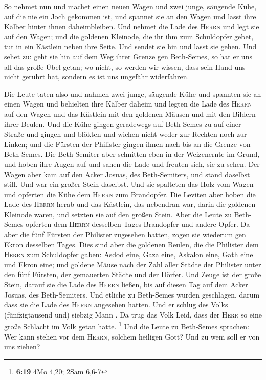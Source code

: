  So nehmet nun und machet einen neuen Wagen und zwei
junge, säugende Kühe, auf die nie ein Joch gekommen ist, und spannet sie
an den Wagen und lasst ihre Kälber hinter ihnen daheimbleiben.
 Und nehmet die Lade des \textsc{Herrn} und legt sie auf
den Wagen; und die goldenen Kleinode, die ihr ihm zum Schuldopfer gebet,
tut in ein Kästlein neben ihre Seite. Und sendet sie hin und lasst sie
gehen.  Und sehet zu: geht sie hin auf dem Weg ihrer
Grenze gen Beth-Semes, so hat er uns all das große Übel getan; wo nicht,
so werden wir wissen, dass sein Hand uns nicht gerührt hat, sondern es
ist uns ungefähr widerfahren.

 Die Leute taten also und nahmen zwei junge, säugende
Kühe und spannten sie an einen Wagen und behielten ihre Kälber daheim
 und legten die Lade des \textsc{Herrn} auf den Wagen und
das Kästlein mit den goldenen Mäusen und mit den Bildern ihrer Beulen.
 Und die Kühe gingen geradewegs auf Beth-Semes zu auf
einer Straße und gingen und blökten und wichen nicht weder zur Rechten
noch zur Linken; und die Fürsten der Philister gingen ihnen nach bis an
die Grenze von Beth-Semes.  Die Beth-Semiter aber
schnitten eben in der Weizenernte im Grund, und hoben ihre Augen auf und
sahen die Lade und freuten sich, sie zu sehen.  Der Wagen
aber kam auf den Acker Josuas, des Beth-Semiters, und stand daselbst
still. Und war ein großer Stein daselbst. Und sie spalteten das Holz vom
Wagen und opferten die Kühe dem \textsc{Herrn} zum Brandopfer.
 Die Leviten aber hoben die Lade des \textsc{Herrn} herab
und das Kästlein, das nebendran war, darin die goldenen Kleinode waren,
und setzten sie auf den großen Stein. Aber die Leute zu Beth-Semes
opferten dem \textsc{Herrn} desselben Tages Brandopfer und andere Opfer.
 Da aber die fünf Fürsten der Philister zugesehen hatten,
zogen sie wiederum gen Ekron desselben Tages.  Dies sind
aber die goldenen Beulen, die die Philister dem \textsc{Herrn} zum
Schuldopfer gaben: Asdod eine, Gaza eine, Askalon eine, Gath eine und
Ekron eine;  und goldene Mäuse nach der Zahl aller Städte
der Philister unter den fünf Fürsten, der gemauerten Städte und der
Dörfer. Und Zeuge ist der große Stein, darauf sie die Lade des
\textsc{Herrn} ließen, bis auf diesen Tag auf dem Acker Josuas, des
Beth-Semiters.  Und etliche zu Beth-Semes wurden
geschlagen, darum dass sie die Lade des \textsc{Herrn} angesehen hatten.
Und er schlug des Volks (fünfzigtausend und) siebzig Mann . Da trug das
Volk Leid, dass der \textsc{Herr} so eine große Schlacht im Volk getan
hatte. \footnote{\textbf{6:19} 4Mo 4,20; 2Sam 6,6-7}  Und
die Leute zu Beth-Semes sprachen: Wer kann stehen vor dem
\textsc{Herrn}, solchem heiligen Gott? Und zu wem soll er von uns
ziehen?

